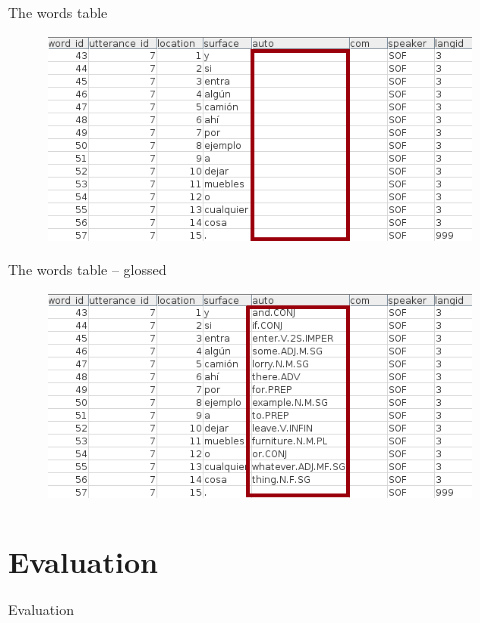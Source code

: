 \documentclass[hyperref={pdfpagelabels=false}, 14pt]{beamer}
\begin{document}
\begin{frame}{The words table}
  \begin{figure}[h]
  \centering
  \includegraphics[width=\textwidth]{images/words_table1.png}
  \end{figure}
\end{frame}


\begin{frame}{The words table -- glossed}
  \begin{figure}[h]
  \centering
  \includegraphics[width=\textwidth]{images/words_table.png}
  \end{figure}
\end{frame}


\section{Evaluation}


\begin{frame}{}
\begin{center}
\begin{huge} \textcolor{ESRCred}{Evaluation} \end{huge}
\end{center}
\end{frame}
\end{document}
